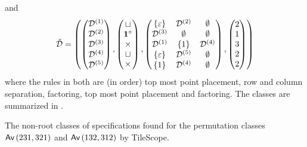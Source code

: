 and
\[
    \check{\mathcal{D}} = \left(
    \begin{pmatrix}
        \mathcal{D}^{(1)} \\\mathcal{D}^{(2)}\\\mathcal{D}^{(3)}\\\mathcal{D}^{(4)}\\\mathcal{D}^{(5)}    
    \end{pmatrix}
    \begin{matrix}\\,\end{matrix}
    \begin{pmatrix}
        \sqcup\\
        \mathbf{1}^\circ\\
        \times\\
        \sqcup\\
        \times
    \end{pmatrix}
    \begin{matrix}\\,\end{matrix}
    \begin{pmatrix}
        \left\{\varepsilon\right\} & \mathcal{D}^{(2)} & \emptyset\\
        \mathcal{D}^{(3)} & \emptyset & \emptyset\\
        \mathcal{D}^{(1)} & \left\{1\right\} & \mathcal{D}^{(4)}\\
        \left\{\varepsilon\right\} & \mathcal{D}^{(5)} & \emptyset\\
        \left\{1\right\} & \mathcal{D}^{(4)} & \emptyset
    \end{pmatrix}
    \begin{matrix}\\,\end{matrix}
    \begin{pmatrix}
        2\\1\\3\\2\\2
    \end{pmatrix}
    \right)
\]
where the rules in both are (in order) top most point placement, row and column separation, factoring, top most point placement and factoring. The classes are summarized in .

\begin{table}[ht!]
    \centering
    
    \caption{The non-root classes of specifications found for the permutation classes $\textsf{Av}\left(231,321\right)$ and $\textsf{Av}\left(132,312\right)$ by TileScope.}
    \label{tab:parmapex}
\end{table}

